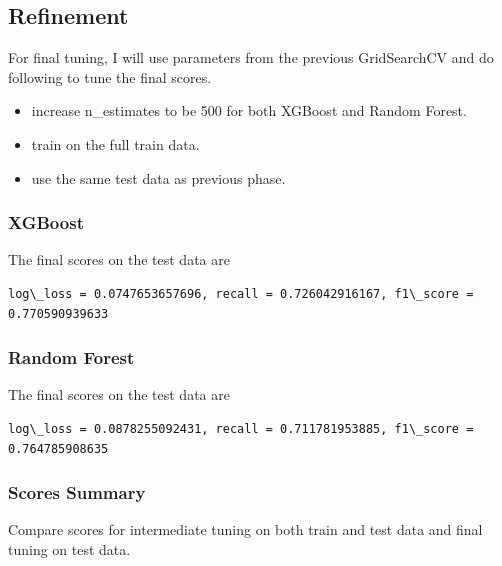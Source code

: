 \documentclass[11pt]{article}
\begin{document}
    \subsection{Refinement}\label{refinement}

For final tuning, I will use parameters from the previous GridSearchCV
and do following to tune the final scores.

\begin{itemize}
\itemsep1pt\parskip0pt
\item
  increase n\_estimates to be 500 for both XGBoost and Random Forest.
\item
  train on the full train data.
\item
  use the same test data as previous phase.
\end{itemize}

\subsubsection{XGBoost}\label{xgboost}

The final scores on the test data are

    \begin{Verbatim}[commandchars=\\\{\}]
log\_loss = 0.0747653657696, recall = 0.726042916167, f1\_score = 0.770590939633

    \end{Verbatim}

    \subsubsection{Random Forest}\label{random-forest}

The final scores on the test data are

    \begin{Verbatim}[commandchars=\\\{\}]
log\_loss = 0.0878255092431, recall = 0.711781953885, f1\_score = 0.764785908635

    \end{Verbatim}

    \subsubsection{Scores Summary}\label{scores-summary}

Compare scores for intermediate tuning on both train and test data and
final tuning on test data.
\end{document}
